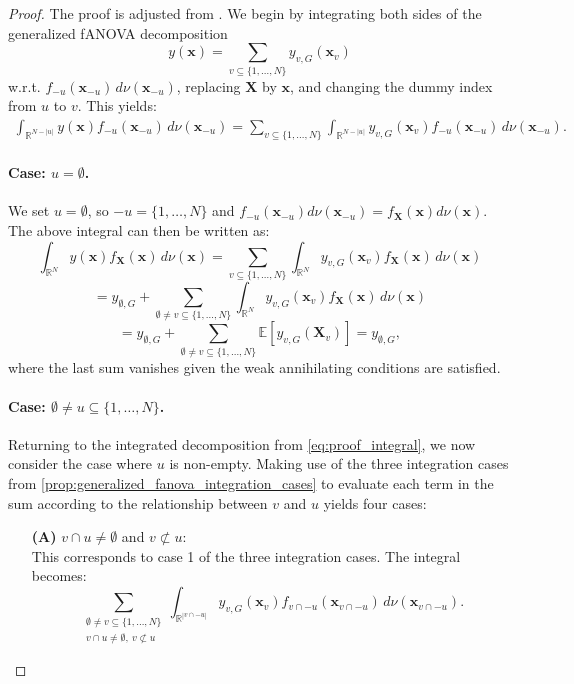 \begin{proof}
The proof is adjusted from \cite{rahman2014}. We begin by integrating both sides of the generalized fANOVA decomposition
\[
y(\boldsymbol{x}) = \sum_{v \subseteq \{1,\dots,N\}} y_{v,G}(\boldsymbol{x}_v)
\]
w.r.t. $f_{-u}(\boldsymbol{x}_{-u})\, d \nu(\boldsymbol{x}_{-u})$, replacing $\boldsymbol{X}$ by $\boldsymbol{x}$, and changing the dummy index from $u$ to $v$. This yields:
\begin{align}\label{eq:proof_integral}
    \int_{\mathbb{R}^{N - |u|}} y(\boldsymbol{x}) f_{-u}(\boldsymbol{x}_{-u}) \, d \nu(\boldsymbol{x}_{-u})
    = \sum_{v \subseteq \{1,\dots,N\}} \int_{\mathbb{R}^{N - |u|}} y_{v,G}(\boldsymbol{x}_v) f_{-u}(\boldsymbol{x}_{-u}) \, d \nu(\boldsymbol{x}_{-u}).
\end{align}

\paragraph{Case: \( u = \emptyset \).}
We set $u = \emptyset$, so $-u = \{1,\dots,N\}$ and $f_{-u}(\boldsymbol{x}_{-u}) d \nu(\boldsymbol{x}_{-u}) = f_{\boldsymbol{X}}(\boldsymbol{x}) d \nu(\boldsymbol{x})$. The above integral can then be written as:
\[
\int_{\mathbb{R}^N} y(\boldsymbol{x}) f_{\boldsymbol{X}}(\boldsymbol{x}) \, d \nu(\boldsymbol{x})
= \sum_{v \subseteq \{1,\dots,N\}} \int_{\mathbb{R}^N} y_{v,G}(\boldsymbol{x}_v) f_{\boldsymbol{X}}(\boldsymbol{x}) \, d \nu(\boldsymbol{x})
\]
\[
= y_{\emptyset,G}
+ \sum_{\emptyset \ne v \subseteq \{1,\dots,N\}} \int_{\mathbb{R}^N} y_{v,G}(\boldsymbol{x}_v) f_{\boldsymbol{X}}(\boldsymbol{x}) \, d \nu(\boldsymbol{x})
\]
\[
= y_{\emptyset,G} + \sum_{\emptyset \ne v \subseteq \{1,\dots,N\}} \mathbb{E}[y_{v,G}(\boldsymbol{X}_v)] = y_{\emptyset,G},
\]
where the last sum vanishes given the weak annihilating conditions are satisfied.

\paragraph{Case: \( \emptyset \ne u \subseteq \{1,\dots,N\} \).}
Returning to the integrated decomposition from \autoref{eq:proof_integral}, we now consider the case where \( u \) is non-empty.
Making use of the three integration cases from \autoref{prop:generalized_fanova_integration_cases} to evaluate each term in the sum according to the relationship between $v$ and $u$ yields four cases:

\begin{itemize}
  \item[\textbf{(A)}] \( v \cap u \ne \emptyset \) and \( v \not\subset u \): \\
  This corresponds to case 1 of the three integration cases. The integral becomes:
  \[
  \sum_{\substack{\emptyset \ne v \subseteq \{1,\dots,N\} \\ v \cap u \ne \emptyset,\ v \not\subset u}} 
  \int_{\mathbb{R}^{|v \cap -u|}} y_{v,G}(\boldsymbol{x}_v) f_{v \cap -u}(\boldsymbol{x}_{v \cap -u}) \, d \nu(\boldsymbol{x}_{v \cap -u}).
  \]


\end{itemize}
\end{proof}
